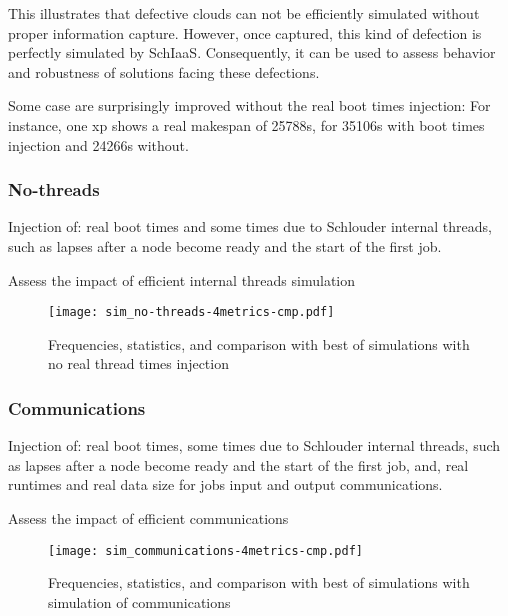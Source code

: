 \documentclass[parallelisme]{compas2017}
\newcommand\vrpath{../../lab/setup/simschlouder/validation-results/}
\begin{document}
This illustrates that defective clouds can not be efficiently simulated without 
proper information capture. However, once captured, this kind of defection is
perfectly simulated by SchIaaS. Consequently, it can be used to assess behavior 
and robustness of solutions facing these defections.

Some case are surprisingly improved without the real boot times injection:
For instance, one xp shows a real makespan of 25788s, for 35106s with boot times
injection and 24266s without. 




\subsubsection{No-threads}

Injection of: real boot times and some times due to Schlouder internal threads, 
such as lapses after a node become ready and the start of the first job.

Assess the impact of efficient internal threads simulation

\begin{figure}
  \centering
  \texttt{[image: sim\_no-threads-4metrics-cmp.pdf]}
  
  

  

  
    
  \caption{Frequencies, statistics, and comparison with best of simulations with no real thread times
  injection}
\end{figure} 



\subsubsection{Communications}

Injection of: real boot times, some times due to Schlouder internal threads, 
such as lapses after a node become ready and the start of the first job, 
and, real runtimes and real data size for jobs input and output communications.

Assess the impact of efficient communications 

\begin{figure}
  \centering
  \texttt{[image: sim\_communications-4metrics-cmp.pdf]}
  
  

  

  

  \caption{Frequencies, statistics, and comparison with best of simulations with simulation of communications}
\end{figure} 
\end{document}
